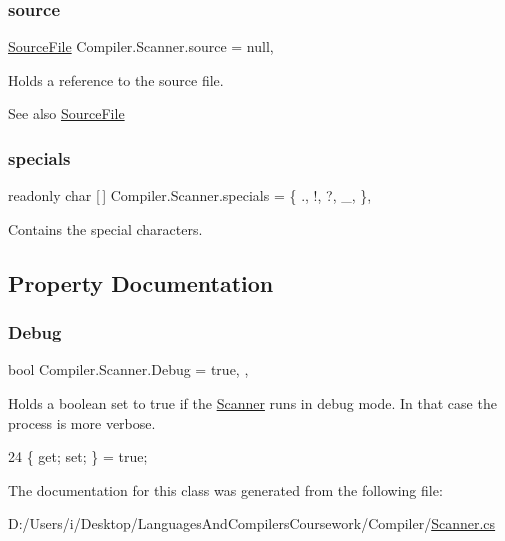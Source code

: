 \subsubsection{\texorpdfstring{source}{source}}
{\footnotesize\ttfamily \mbox{\hyperlink{class_compiler_1_1_source_file}{Source\+File}} Compiler.\+Scanner.\+source = null\hspace{0.3cm}{\ttfamily [static]}, {\ttfamily [private]}}

Holds a reference to the source file. \begin{DoxySeeAlso}{See also}
\mbox{\hyperlink{class_compiler_1_1_source_file}{Source\+File}} 
\end{DoxySeeAlso}
\mbox{\label{class_compiler_1_1_scanner_ab3e4b27f11afa6d99ec2f09e8ab0b8bd}} 
\subsubsection{\texorpdfstring{specials}{specials}}
{\footnotesize\ttfamily readonly char \mbox{[}$\,$\mbox{]} Compiler.\+Scanner.\+specials = \{ \textquotesingle{}.\textquotesingle{}, \textquotesingle{}!\textquotesingle{}, \textquotesingle{}?\textquotesingle{}, \textquotesingle{}\+\_\+\textquotesingle{}, \textquotesingle{} \textquotesingle{} \}\hspace{0.3cm}{\ttfamily [static]}, {\ttfamily [private]}}

Contains the special characters. 

\subsection{Property Documentation}
\mbox{\label{class_compiler_1_1_scanner_aebce05a12eba0f6267dfa8dd2fa07b1f}} 
\subsubsection{\texorpdfstring{Debug}{Debug}}
{\footnotesize\ttfamily bool Compiler.\+Scanner.\+Debug = true\hspace{0.3cm}{\ttfamily [static]}, {\ttfamily [get]}, {\ttfamily [set]}}

Holds a boolean set to true if the \mbox{\hyperlink{class_compiler_1_1_scanner}{Scanner}} runs in debug mode. In that case the process is more verbose. 
\begin{DoxyCode}
24 \{ \textcolor{keyword}{get}; \textcolor{keyword}{set}; \} = \textcolor{keyword}{true};
\end{DoxyCode}


The documentation for this class was generated from the following file\+:\begin{DoxyCompactItemize}
\item 
D\+:/\+Users/i/\+Desktop/\+Languages\+And\+Compilers\+Coursework/\+Compiler/\mbox{\hyperlink{_scanner_8cs}{Scanner.\+cs}}\end{DoxyCompactItemize}
